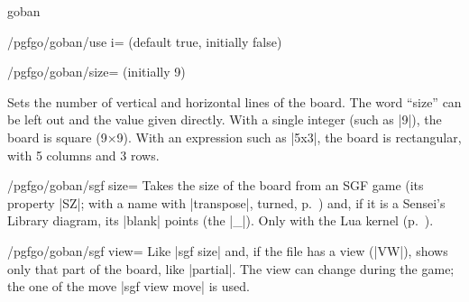 \begin{environment}{{goban}}
\begin{key}{/pgfgo/goban/use i= (default true, initially false)}
\begin{codeexample}[]
			\begin{goban}[partial = H1:N3]
			\end{goban}

			\begin{goban}[label = {at = east}, partial = H1:N3]
			\end{goban}
		\end{codeexample}
	\end{key}

	\begin{key}{/pgfgo/goban/size= (initially 9)}

		Sets the number of vertical and horizontal lines of the board. The word ``size'' can be left out and the value given directly. With a single integer (such as |9|), the board is square (9×9). With an expression such as |5x3|, the board is rectangular, with 5 columns and 3 rows.

		\begin{codeexample}[width=6.5cm]
			\begin{goban}[5]
			\end{goban}

			\begin{goban}[5x3]
			\end{goban}
		\end{codeexample}
	\end{key}

	\begin{key}{/pgfgo/goban/sgf size=}
		Takes the size of the board from an SGF game (its property |SZ|; with a name with |transpose|, turned, p.~\pageref{subsec:sgfnombres}) and, if it is a Sensei's Library diagram, its |blank| points (the |_|). Only with the Lua kernel (p.~\pageref{subsec:kernel}).

		\begin{codeexample}[]
			\begin{goban}[sgf size = variations, label = {at = {north, west}}]
			\end{goban}
		\end{codeexample}
	\end{key}

	\begin{key}{/pgfgo/goban/sgf view=}
		Like |sgf size| and, if the file has a view (|VW|), shows only that part of the board, like |partial|. The view can change during the game; the one of the move |sgf view move| is used.
	\end{key}


\end{environment}
